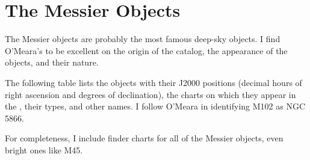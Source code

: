 
\chapter{The Messier Objects}

The Messier objects are probably the most famous deep-sky objects. I find O’Meara’s  to be excellent  on the origin of the catalog, the appearance of the objects, and their nature.

The following table lists the objects with their J2000 positions (decimal hours of right ascension and degrees of declination), the charts on which they appear in the {\PSA}, their types, and other names. I follow O’Meara in identifying M102 as NGC 5866.

For completeness, I include finder charts for all of the Messier objects, even bright ones like M45.


\clearpage


